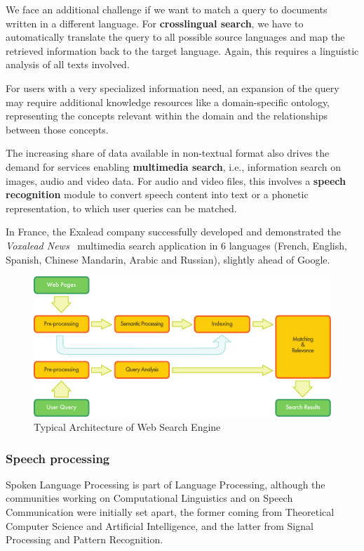 \begin{multicols}{2}
We face an additional challenge if we want to match a query to
documents written in a different language. For {\bf crosslingual search}, we
have to automatically translate the query to all possible source
languages and map the retrieved information back to the target
language. Again, this requires a linguistic analysis of all texts
involved.

For users with a very specialized information need, an expansion of
the query may require additional knowledge resources like a
domain-specific ontology, representing the concepts relevant within
the domain and the relationships between those concepts.

The increasing share of data available in non-textual format also
drives the demand for services enabling {\bf multimedia search}, i.e.,
information search on images, audio and video data. For audio and
video files, this involves a {\bf speech recognition} module to convert
speech content into text or a phonetic representation, to which user
queries can be matched.

In France, the Exalead company successfully developed and demonstrated
the {\em Voxalead News}~\cite{voxaleadnews} multimedia search application in 6 languages
(French, English, Spanish, Chinese Mandarin, Arabic and Russian),
slightly ahead of Google.

\begin{figure}[!ht]
\begin{center}
 \includegraphics[width=\width]{../_media/english/web_search_architecture}
 \caption{Typical Architecture of Web Search Engine}
\label{fig:archiwebEn}
\end{center}
\end{figure}

\subsubsection{Speech processing} 
Spoken Language Processing is part of Language Processing, although
the communities working on Computational Linguistics and on Speech
Communication were initially set apart, the former coming from
Theoretical Computer Science and Artificial Intelligence, and the
latter from Signal Processing and Pattern Recognition.


\end{multicols}

